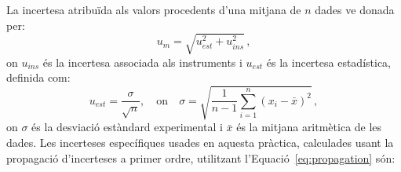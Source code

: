 \documentclass[a4paper,twoside,12pt]{article}
\theoremstyle{definition}
\begin{document}
	
	La incertesa atribuïda als valors procedents d'una mitjana de $n$ dades ve donada per:
	\begin{equation*}
		u_m = \sqrt{u_{est}^2+u_{ins}^2}\,,
	\end{equation*}
	on $u_{ins}$ és la incertesa associada als instruments i $u_{est}$ és la incertesa estadística, definida com:
	\begin{equation*}
		u_{est} = \frac{\sigma}{\sqrt{n}}, \quad \text{on} \quad \sigma = \sqrt{ \frac{1}{n - 1} \sum_{i=1}^{n} (x_i - \bar{x})^2}\,,
	\end{equation*}
	on $\sigma$ és la desviació estàndard experimental i $\bar{x}$ és la mitjana aritmètica de les dades.
	\newline
Les incerteses específiques usades en aquesta pràctica, calculades usant la propagació d'incerteses a primer ordre, utilitzant l'Equació~\ref{eq:propagation} són:
\end{document}
